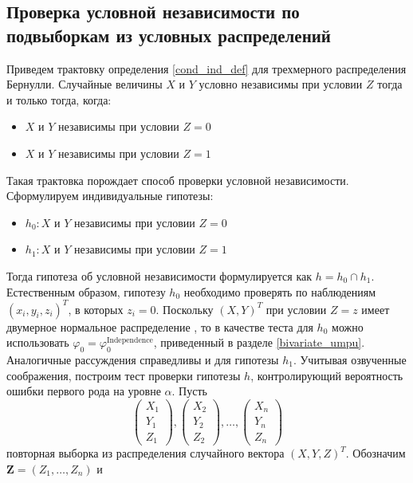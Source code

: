 \begin{centering}
    \subsection{Проверка условной независимости по подвыборкам из условных распределений}
\end{centering}

Приведем трактовку определения \ref{cond_ind_def} для трехмерного
распределения Бернулли. Случайные величины $X$ и $Y$
условно независимы при условии $Z$ тогда и только тогда,
когда:
\begin{itemize}
    \item $X$ и $Y$ независимы при условии $Z=0$
    \item $X$ и $Y$  независимы при условии $Z=1$
\end{itemize}
Такая трактовка порождает способ проверки условной независимости. 
Сформулируем индивидуальные гипотезы:
\begin{itemize}
    \item $h_0 : X$ и $Y$ независимы при условии $Z=0$
    \item $h_1 : X$ и $Y$ независимы при условии $Z=1$
\end{itemize}
Тогда гипотеза об условной независимости формулируется как 
$h = h_0 \cap h_1$. Естественным образом, гипотезу 
$h_0$ необходимо проверять по наблюдениям
$(x_i,y_i,z_i)^T$, в которых $z_i=0$. Поскольку $(X,Y)^T$ при условии
$Z=z$ имеет двумерное нормальное распределение \cite{Dai2013}, то
в качестве теста для $h_0$ можно использовать 
$\varphi_0 = \varphi^{\text{Independence}}_0$, 
приведенный в разделе \ref{bivariate_umpu}. Аналогичные рассуждения 
справедливы и для гипотезы $h_1$. Учитывая озвученные соображения,
построим тест проверки гипотезы $h$, контролирующий вероятность
ошибки первого рода на уровне $\alpha$.
Пусть
$$
\begin{pmatrix}
        X_1 \\
        Y_1 \\
        Z_1
    \end{pmatrix},
    \begin{pmatrix}
        X_2 \\
        Y_2 \\
        Z_2
    \end{pmatrix}, \ldots,
    \begin{pmatrix}
        X_n \\
        Y_n \\
        Z_n
    \end{pmatrix}
$$ повторная выборка из распределения случайного вектора $(X,Y,Z)^T$. Обозначим $\mathbf{Z}=(Z_1,\ldots,Z_n)$ и 
